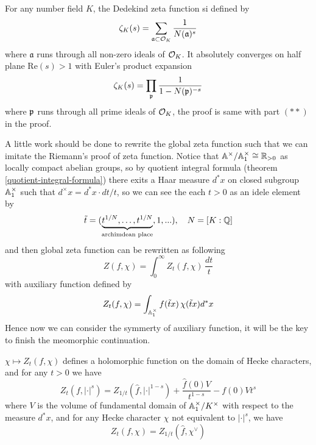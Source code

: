 \begin{example}
    For any number field \(K\), the Dedekind zeta function si defined by 
    \[\zeta_K(s) = \sum_{\mathfrak{a} \subset \mathcal{O}_K} \frac{1}{N(\mathfrak{a})^s}\]
    where \(\mathfrak{a}\) runs through all non-zero ideals of \(\mathcal{O}_K\). It absolutely converges on half plane \(\mathrm{Re}(s) >1\) with Euler's product expansion
\[\zeta_K(s) = \prod_{\mathfrak{p}} \frac{1}{1-N(\mathfrak{p})^{-s}}\]
where \(\mathfrak{p}\) runs through all prime ideals of \(\mathcal{O}_K\), the proof is same with part \((**)\) in the proof.
\end{example}




A little work should be done to rewrite the global zeta function such that we can imitate the Riemann's proof of zeta function. Notice that \(\mathbb{A}^\times / \mathbb{A}^\times_1 \cong \mathbb{R}_{>0}\) as locally compact abelian groups, so by quotient integral formula (theorem \ref{quotient-integral-formula}) there exits a Haar measure \(d^* x\) on closed subgroup \(\mathbb{A}^\times_1\) such that \(d^\times x = d^*x \cdot dt/t\), so we can see the each \(t>0\) as an idele element by
\[\tilde{t} = (\underbrace{t^{1/N},\dots,t^{1/N}}_{\text{archimdean place}},1,...), \quad N = [K: \mathbb{Q}]\]
and then global zeta function can be rewritten as following
\begin{equation}
    Z(f,\chi) = \int_0^\infty Z_t(f,\chi) \, \frac{dt}{t}
\end{equation} \label{global-zeta-1}
with auxiliary function defined by
\[Z_t(f,\chi) = \int_{\mathbb{A}_1^\times} f(\tilde{t}x) \, \chi(\tilde{t}x) d^* x\]
Hence now we can consider the symmerty of auxiliary function, it will be the key to finish the meomorphic continuation.

\begin{lemma} \label{fct-eq-auxiliary}
     \(\chi \mapsto Z_t(f,\chi)\) defines a holomorphic function on the domain of Hecke characters, and for any \(t>0\) we have
     \[Z_t(f,|\cdot|^s)  = Z_{1/t}(\hat{f},|\cdot|^{1-s}) + \frac{\hat{f}(0)V}{t^{1-s}} - f(0)V t^s\]
     where \(V\) is the volume of fundamental domain of \(\mathbb{A}_1^\times/K^\times\) with respect to the measure \(d^*x\), and for any Hecke character \(\chi\) not equivalent to \(|\cdot|^s\), we have
        \[Z_t(f,\chi) = Z_{1/t}(\hat{f},\chi^\vee)\]
\end{lemma}

